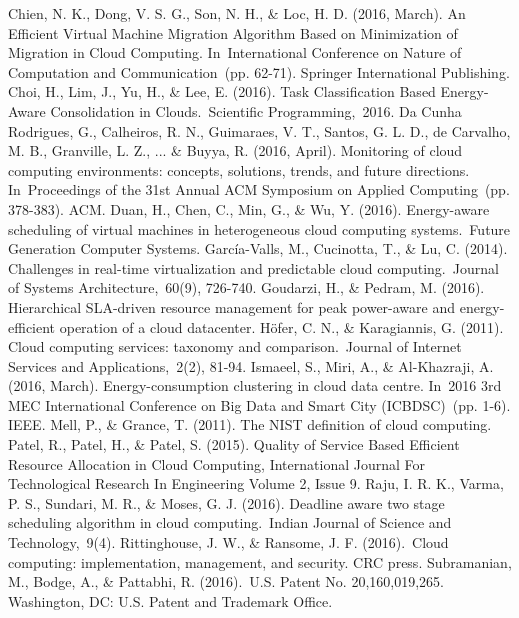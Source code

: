 \begin{thebibliography}{99}
\begin{LTRbibitems}
	 Chien, N. K., Dong, V. S. G., Son, N. H., \& Loc, H. D. (2016, March). An Efficient Virtual Machine Migration Algorithm Based on Minimization of Migration in Cloud Computing. In International Conference on Nature of Computation and Communication (pp. 62-71). Springer International Publishing.
	 Choi, H., Lim, J., Yu, H., \& Lee, E. (2016). Task Classification Based Energy-Aware Consolidation in Clouds. Scientific Programming, 2016.
	Da Cunha Rodrigues, G., Calheiros, R. N., Guimaraes, V. T., Santos, G. L. D., de Carvalho, M. B., Granville, L. Z., ... \& Buyya, R. (2016, April). Monitoring of cloud computing environments: concepts, solutions, trends, and future directions. In Proceedings of the 31st Annual ACM Symposium on Applied Computing (pp. 378-383). ACM.
	  Duan, H., Chen, C., Min, G., \& Wu, Y. (2016). Energy-aware scheduling of virtual machines in heterogeneous cloud computing systems. Future Generation Computer Systems.
	García-Valls, M., Cucinotta, T., \& Lu, C. (2014). Challenges in real-time virtualization and predictable cloud computing. Journal of Systems Architecture, 60(9), 726-740.
	 Goudarzi, H., \& Pedram, M. (2016). Hierarchical SLA-driven resource management for peak power-aware and energy-efficient operation of a cloud datacenter.
	Höfer, C. N., \& Karagiannis, G. (2011). Cloud computing services: taxonomy and comparison. Journal of Internet Services and Applications, 2(2), 81-94.
	  Ismaeel, S., Miri, A., \& Al-Khazraji, A. (2016, March). Energy-consumption clustering in cloud data centre. In 2016 3rd MEC International Conference on Big Data and Smart City (ICBDSC) (pp. 1-6). IEEE.
	Mell, P., \& Grance, T. (2011). The NIST definition of cloud computing.
	  Patel, R., Patel, H., \& Patel, S. (2015). Quality of Service Based Efficient Resource Allocation in Cloud Computing, International Journal For Technological Research In Engineering Volume 2, Issue 9.
	  Raju, I. R. K., Varma, P. S., Sundari, M. R., \& Moses, G. J. (2016). Deadline aware two stage scheduling algorithm in cloud computing. Indian Journal of Science and Technology, 9(4).
	Rittinghouse, J. W., \& Ransome, J. F. (2016). Cloud computing: implementation, management, and security. CRC press.
	 Subramanian, M., Bodge, A., \& Pattabhi, R. (2016). U.S. Patent No. 20,160,019,265. Washington, DC: U.S. Patent and Trademark Office.









\end{LTRbibitems}
\end{thebibliography}
